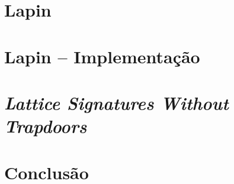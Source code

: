 \documentclass[11pt,a4paper,notitlepage]{report} %
\newcommand{\sage}{\texttt{Sage}}
\begin{document}

%
\newpage
%

\newpage
%
%
\tableofcontents
\newpage
%

\chapter{Lapin}

\chapter{Lapin -- Implementação}




\chapter{\textit{Lattice Signatures Without Trapdoors}}


\chapter{Conclusão}

%
%

\nocite{*} %

%
%
%
\end{document}
